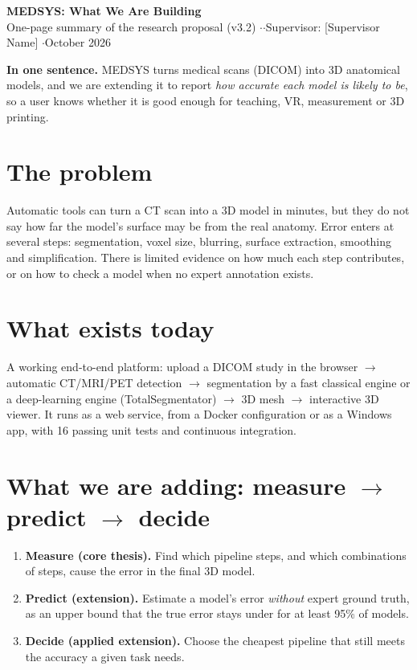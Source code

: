 \documentclass[10pt,a4paper]{article}
\begin{document}
\color{brandtext}

\begin{center}
{\LARGE\bfseries MEDSYS: What We Are Building}\\[4pt]
{\small\color{brandtext2} One-page summary of the research proposal (v3.2) \enspace$\cdot$ \enspace$\cdot$\enspace Supervisor: [Supervisor Name] \enspace$\cdot$\enspace October 2026}
\end{center}
\vspace{-4pt}{\color{brandorange}\rule{\linewidth}{1.2pt}}

\textbf{In one sentence.} MEDSYS turns medical scans (DICOM) into 3D anatomical models, and we are extending it to report \emph{how accurate each model is likely to be}, so a user knows whether it is good enough for teaching, VR, measurement or 3D printing.

\section{The problem}
Automatic tools can turn a CT scan into a 3D model in minutes, but they do not say how far the model's surface may be from the real anatomy. Error enters at several steps: segmentation, voxel size, blurring, surface extraction, smoothing and simplification. There is limited evidence on how much each step contributes, or on how to check a model when no expert annotation exists.

\section{What exists today}
A working end-to-end platform: upload a DICOM study in the browser $\rightarrow$ automatic CT/MRI/PET detection $\rightarrow$ segmentation by a fast classical engine or a deep-learning engine (TotalSegmentator) $\rightarrow$ 3D mesh $\rightarrow$ interactive 3D viewer. It runs as a web service, from a Docker configuration or as a Windows app, with 16 passing unit tests and continuous integration.

\section{What we are adding: measure $\rightarrow$ predict $\rightarrow$ decide}
\begin{enumerate}[leftmargin=1.6em]
\item \textbf{Measure (core thesis).} Find which pipeline steps, and which combinations of steps, cause the error in the final 3D model.
\item \textbf{Predict (extension).} Estimate a model's error \emph{without} expert ground truth, as an upper bound that the true error stays under for at least 95\% of models.
\item \textbf{Decide (applied extension).} Choose the cheapest pipeline that still meets the accuracy a given task needs.
\end{enumerate}
\end{document}
